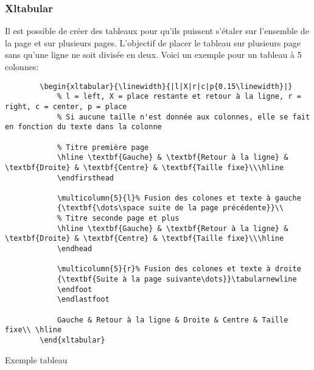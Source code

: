 \subsubsection{Xltabular}
Il est possible de créer des tableaux pour qu'ils puissent s'étaler sur l'ensemble de la page et sur plusieurs pages.
L'objectif de placer le tableau sur plusieurs page sans qu'une ligne ne soit divisée en deux.
Voici un exemple pour un tableau à 5 colonnes:
\begin{code}
    \begin{verbatim}
        \begin{xltabular}{\linewidth}{|l|X|r|c|p{0.15\linewidth}|}
            % l = left, X = place restante et retour à la ligne, r = right, c = center, p = place
            % Si aucune taille n'est donnée aux colonnes, elle se fait en fonction du texte dans la colonne

            % Titre première page
            \hline \textbf{Gauche} & \textbf{Retour à la ligne} & \textbf{Droite} & \textbf{Centre} & \textbf{Taille fixe}\\\hline
            \endfirsthead

            \multicolumn{5}{l}% Fusion des colones et texte à gauche
            {\textbf{\dots\space suite de la page précédente}}\\
            % Titre seconde page et plus
            \hline \textbf{Gauche} & \textbf{Retour à la ligne} & \textbf{Droite} & \textbf{Centre} & \textbf{Taille fixe}\\\hline
            \endhead

            \multicolumn{5}{r}% Fusion des colones et texte à droite
            {\textbf{Suite à la page suivante\dots}}\tabularnewline
            \endfoot
            \endlastfoot

            Gauche & Retour à la ligne & Droite & Centre & Taille fixe\\ \hline
        \end{xltabular}
\end{verbatim}
    \caption{Exemple tableau}
\end{code}

